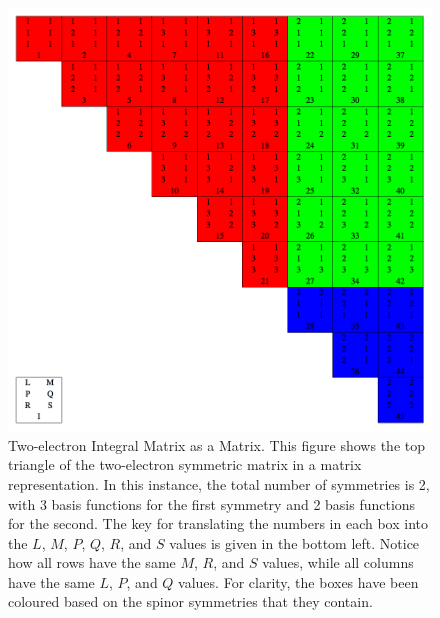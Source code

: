 \documentclass[12pt]{report}
\begin{document}
\begin{figure}[h!]
\includegraphics[width=1\textwidth]{Figures/eint2_mat.png}
\caption[Two-electron Integral Matrix as a Matrix]
{Two-electron Integral Matrix as a Matrix. This figure shows the top triangle of the two-electron symmetric matrix in a matrix representation. In this instance, the total number of symmetries is 2, with 3 basis functions for the first symmetry and 2 basis functions for the second. The key for translating the numbers in each box into the $L$, $M$, $P$, $Q$, $R$, and $S$ values is given in the bottom left. Notice how all rows have the same $M$, $R$, and $S$ values, while all columns have the same $L$, $P$, and $Q$ values. For clarity, the boxes have been coloured based on the spinor symmetries that they contain.}
\label{fig:eint2mat}
\end{figure}
\end{document}
